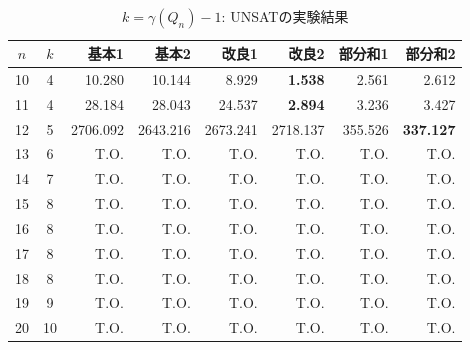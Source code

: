 \begin{table}[ht]
 \caption{$k=\gamma(Q_n)-1$: UNSATの実験結果}
 \label{tb:exUNSAT}
 \centering 
 \begin{tabular}{c|c|r|r|r|r|r|r} \hline
  $n$ & $k$ & 基本1 & 基本2 & 改良1 & 改良2 & 部分和1 & 部分和2 \\ \hline
  10 & 4 & 10.280 & 10.144 & 8.929 & \textbf{1.538} & 2.561 & 2.612 \\
  11 & 4 & 28.184 & 28.043 & 24.537 & \textbf{2.894} & 3.236 & 3.427 \\
  12 & 5 & 2706.092 & 2643.216 & 2673.241 & 2718.137 & 355.526 & \textbf{337.127} \\
  13 & 6 & T.O. & T.O. & T.O. & T.O. & T.O. & T.O. \\  
  14 & 7 & T.O. & T.O. & T.O. & T.O. & T.O. & T.O. \\   
  15 & 8 & T.O. & T.O. & T.O. & T.O. & T.O. & T.O. \\  
  16 & 8 & T.O. & T.O. & T.O. & T.O. & T.O. & T.O. \\
  17 & 8 & T.O. & T.O. & T.O. & T.O. & T.O. & T.O. \\
  18 & 8 & T.O. & T.O. & T.O. & T.O. & T.O. & T.O. \\
  19 & 9 & T.O. & T.O. & T.O. & T.O. & T.O. & T.O. \\
  20 & 10 & T.O. & T.O. & T.O. & T.O. & T.O. & T.O. \\ \hline
 \end{tabular}
\end{table}
\newpage

